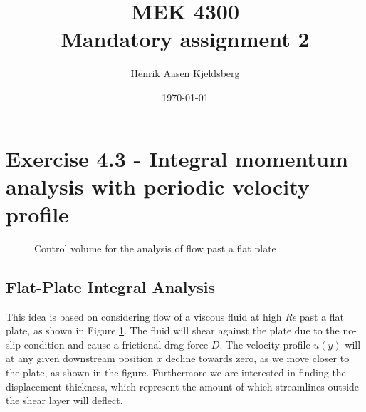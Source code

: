 \documentclass[12pt]{amsart}
\title{MEK 4300\\Mandatory assignment 2}
\author{Henrik Aasen Kjeldsberg}
\date{\today}
\begin{document}
\maketitle
\newpage
\section*{Exercise 4.3 - Integral momentum analysis with periodic velocity profile}


\begin{figure}
\begin{center}

\end{center}
  \caption{Control volume for the analysis of flow past a flat plate} \label{fig:flat}
\end{figure}
\subsection*{Flat-Plate Integral Analysis}
This idea is based on considering flow of a viscous fluid at high \textit{Re} past a flat plate, as shown in Figure \ref{fig:flat}. The fluid will shear against the plate due to the no-slip condition and cause a frictional drag force $D$. The velocity profile $u(y)$ will at any given downstream position $x$ decline towards zero, as we move closer to the plate, as shown in the figure. Furthermore we are interested in finding the displacement thickness, which represent the amount of which streamlines outside the shear layer will deflect.
\end{document}
